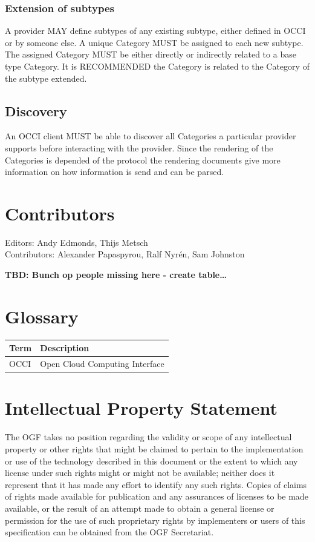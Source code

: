 \documentclass[10pt,a4paper]{article}
\begin{document}
\subsubsection{Extension of subtypes}
A provider MAY define subtypes of any existing subtype, either defined in OCCI or by someone else. A unique Category MUST be assigned to each new subtype. The assigned Category MUST be either directly or indirectly related to a base type Category. It is RECOMMENDED the Category is related to the Category of the subtype extended.

\subsection{Discovery}
An OCCI client MUST be able to discover all Categories a particular provider supports before interacting with the provider. Since the rendering of the Categories is depended of the protocol the rendering documents give more information on how information is send and can be parsed.

\section{Contributors}
Editors: Andy Edmonds, Thijs Metsch \\
Contributors: Alexander Papaspyrou, Ralf Nyrén, Sam Johnston

\textbf{TBD: Bunch op people missing here - create table\ldots}

\section{Glossary}

\begin{tabular}{l|l}
Term & Description \\
\hline
OCCI & Open Cloud Computing Interface \\
\end{tabular}

\section{Intellectual Property Statement}

The OGF takes no position regarding the validity or scope of any intellectual property or other rights that might be claimed to pertain to the implementation or use of the technology described in this document or the extent to which any license under such rights might or might not be available; neither does it represent that it has made any effort to identify any such rights. Copies of claims of rights made available for publication and any assurances of licenses to be made available, or the result of an attempt made to obtain a general license or permission for the use of such proprietary rights by implementers or users of this specification can be obtained from the OGF Secretariat.
\end{document}
